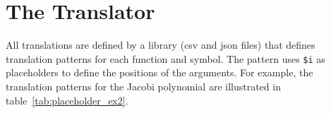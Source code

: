 \section{The Translator}
 

All translations are defined by a library (\gls*{csv} and \gls*{json} files) that defines translation patterns for each function and symbol. The pattern uses \verb|$i| as placeholders to define the positions of the arguments. For example, the translation patterns for the Jacobi polynomial are illustrated in table~\ref{tab:placeholder_ex2}.

